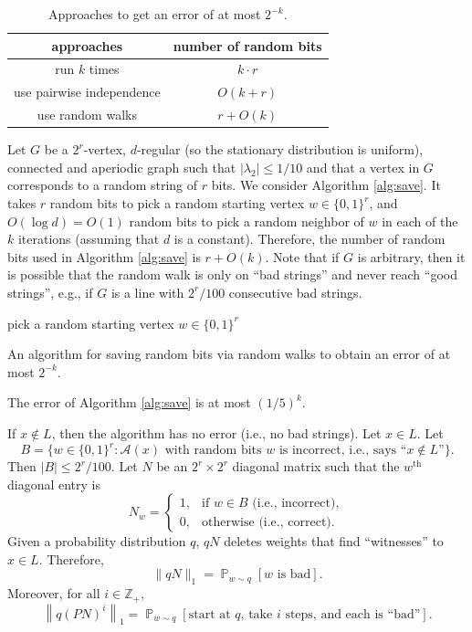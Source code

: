 \documentclass[letterpaper, reqno,11pt]{article}
\newcommand{\ZZ}{\mathbb{Z}}
\newcommand{\PP}{\mathop{{}\mathbb{P}}}
\begin{document}
\begin{table}[h]
  \centering
  \begin{tabular}{c|c}
    approaches & number of random bits \\
    \hline
    \hline
    run $k$ times & $k \cdot r$ \\
    \hline
    use pairwise independence & $O(k + r)$ \\
    \hline
    use random walks & $r + O(k)$
  \end{tabular}
  \caption{Approaches to get an error of at most $2^{-k}$.}
  \label{tab:error}
\end{table}

Let $G$ be a $2^r$-vertex, $d$-regular (so the stationary distribution is uniform), connected and aperiodic graph such that $|\lambda_2| \leq 1/10$ and that a vertex in $G$ corresponds to a random string of $r$ bits. We consider Algorithm \ref{alg:save}. It takes $r$ random bits to pick a random starting vertex $w \in \{ 0, 1 \}^r$, and $O(\log d) = O(1)$ random bits to pick a random neighbor of $w$ in each of the $k$ iterations (assuming that $d$ is a constant). Therefore, the number of random bits used in Algorithm \ref{alg:save} is $r + O(k)$. Note that if $G$ is arbitrary, then it is possible that the random walk is only on ``bad strings'' and never reach ``good strings'', e.g., if $G$ is a line with $2^r/100$ consecutive bad strings.

\begin{algorithm}
  pick a random starting vertex $w \in \{ 0, 1 \}^r$ \\
  \caption{An algorithm for saving random bits via random walks to obtain an error of at most $2^{-k}$.}
  \label{alg:save}
\end{algorithm}

\begin{proposition} \label{prop:error}
  The error of Algorithm \ref{alg:save} is at most $(1/5)^k$.
\end{proposition}

If $x \not \in L$, then the algorithm has no error (i.e., no bad strings). Let $x \in L$. Let
  $$ B = \{ w \in \{ 0, 1 \}^r : \text{$\mathcal A(x)$ with random bits $w$ is incorrect, i.e., says ``$x \not \in L$''} \}. $$
  Then $|B| \leq 2^r/100$. Let $N$ be an $2^r \times 2^r$ diagonal matrix such that the $w^\text{th}$ diagonal entry is
  $$ N_w = \left\{
    \begin{array}{ll}
      1, & \text{if $w \in B$ (i.e., incorrect)}, \\
      0, & \text{otherwise (i.e., correct)}.
    \end{array}
  \right. $$
  Given a probability distribution $q$, $qN$ deletes weights that find ``witnesses'' to $x \in L$. Therefore,
  $$ \| qN \|_1 = \PP_{w \sim q}[\text{$w$ is bad}]. $$
  Moreover, for all $i \in \ZZ_+$,
  $$ \left\| q(PN)^i \right\|_1 = \PP_{w \sim q}[\text{start at $q$, take $i$ steps, and each is ``bad''}]. $$
\end{document}
